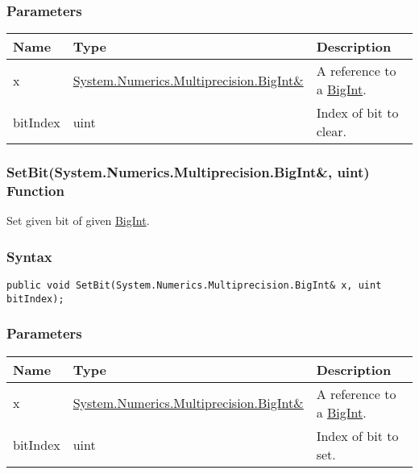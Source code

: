 \documentclass[a4paper,oneside,11.000000pt]{book}
\begin{document}
\subsubsection*{Parameters}
\begin{flushleft}
\begin{supertabular}[l]{!{\raggedright}p{1.94573cm}!{\raggedright}p{7.92093cm}!{\raggedright}p{4.93333cm}}
\textbf{Name}
& \textbf{Type}
& \textbf{Description}
\\
\hline
x
& \hyperlink{System.Numerics.Multiprecision.BigInt}{System.\-Numerics.\-Multiprecision.\-BigInt\&\-}
& A reference to a \hyperlink{System.Numerics.Multiprecision.BigInt}{BigInt}.

\\
bitIndex
& uint
& Index of bit to clear.

\\
\end{supertabular}

\end{flushleft}
\clearpage

\hypertarget{System.Numerics.Multiprecision.SetBit.R.System.Numerics.Multiprecision.BigInt.uint}{\subsubsection*{SetBit(System.Numerics.Multiprecision.BigInt\&, uint) Function}}
\begin{flushleft}
Set given bit of given \hyperlink{System.Numerics.Multiprecision.BigInt}{BigInt}.

\end{flushleft}
\subsubsection*{Syntax}
\texttt{public void SetBit(System.Numerics.Multiprecision.BigInt\& x, uint bitIndex);}
\subsubsection*{Parameters}
\begin{flushleft}
\begin{supertabular}[l]{!{\raggedright}p{1.94573cm}!{\raggedright}p{7.92093cm}!{\raggedright}p{4.93333cm}}
\textbf{Name}
& \textbf{Type}
& \textbf{Description}
\\
\hline
x
& \hyperlink{System.Numerics.Multiprecision.BigInt}{System.\-Numerics.\-Multiprecision.\-BigInt\&\-}
& A reference to a \hyperlink{System.Numerics.Multiprecision.BigInt}{BigInt}.

\\
bitIndex
& uint
& Index of bit to set.

\\
\end{supertabular}

\end{flushleft}
\clearpage
\end{document}

